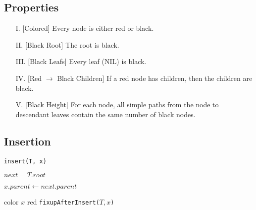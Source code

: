 \documentclass{article}
\begin{document}
\subsection{Properties}
\begin{itemize}
  \item[I.]\label{properties:1} [Colored] Every node is either red or black.
  \item[II.]\label{properties:2} [Black Root] The root is black.
  \item[III.]\label{properties:3} [Black Leafs] Every leaf (NIL) is black.
  \item[IV.]\label{properties:4} [Red $\to$ Black Children] If a red node has children, then the children are black.
  \item[V.]\label{properties:5} [Black Height] For each node, all simple paths from the node to descendant leaves contain the same number of black nodes.
\end{itemize}

\subsection{Insertion}

\begin{algorithm}[H]
  \caption{\texttt{insert(T, x)}}

  \BlankLine

  $next = T.root$\;

  $x.parent \gets next.parent$\;

  color $x$ red\;
  \texttt{fixupAfterInsert($T, x$)}\;
\end{algorithm}
\end{document}
